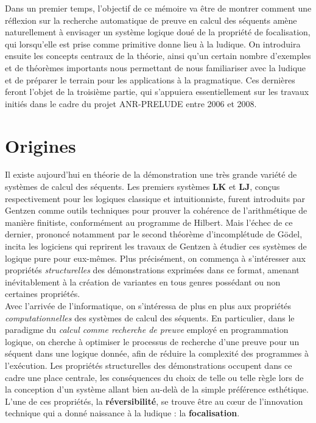 \documentclass[12pt]{report}
\begin{document}
Dans un premier temps, l'objectif de ce mémoire va être de montrer comment une réflexion sur la recherche automatique de preuve en calcul des séquents amène naturellement à envisager un système logique doué de la propriété de focalisation, qui lorsqu'elle est prise comme primitive donne lieu à la ludique. On introduira ensuite les concepts centraux de la théorie, ainsi qu'un certain nombre d'exemples et de théorèmes importants nous permettant de nous familiariser avec la ludique et de préparer le terrain pour les applications à la pragmatique. Ces dernières feront l'objet de la troisième partie, qui s'appuiera essentiellement sur les travaux initiés dans le cadre du projet ANR-PRELUDE entre 2006 et 2008.

\chapter{Origines}

Il existe aujourd'hui en théorie de la démonstration une très grande variété de systèmes de calcul des séquents. Les premiers systèmes $\mathbf{LK}$ et $\mathbf{LJ}$, conçus respectivement pour les logiques classique et intuitionniste, furent introduits par Gentzen comme outils techniques pour prouver la cohérence de l'arithmétique de manière finitiste, conformément au programme de Hilbert. Mais l'échec de ce dernier, prononcé notamment par le second théorème d'incomplétude de Gödel, incita les logiciens qui reprirent les travaux de Gentzen à étudier ces systèmes de logique pure pour eux-mêmes. Plus précisément, on commença à s'intéresser aux propriétés \emph{structurelles} des démonstrations exprimées dans ce format, amenant inévitablement à la création de variantes en tous genres possédant ou non certaines propriétés.\\

Avec l'arrivée de l'informatique, on s'intéressa de plus en plus aux propriétés \emph{computationnelles} des systèmes de calcul des séquents. En particulier, dans le paradigme du \emph{calcul comme recherche de preuve} employé en programmation logique, on cherche à optimiser le processus de recherche d'une preuve pour un séquent dans une logique donnée, afin de réduire la complexité des programmes à l'exécution. Les propriétés structurelles des démonstrations occupent dans ce cadre une place centrale, les conséquences du choix de telle ou telle règle lors de la conception d'un système allant bien au-delà de la simple préférence esthétique. L'une de ces propriétés, la \textbf{réversibilité}, se trouve être au c\oe{}ur de l'innovation technique qui a donné naissance à la ludique : la \textbf{focalisation}.
\end{document}
